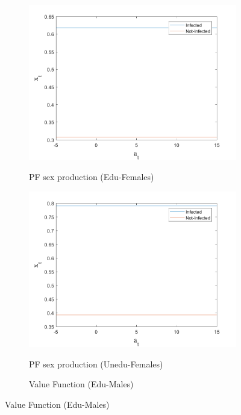 \begin{figure}[H]
\bigskip
\begin{subfigure}{0.5\textwidth}\caption{PF sex production (Edu-Females)}
   \includegraphics[width=\linewidth,height = 0.22\textheight]{figures/mio/FIG11.png}
    \label{fig_dert}
\end{subfigure}
\hspace*{\fill}
\begin{subfigure}{0.5\textwidth}\caption{PF sex production (Unedu-Females)}
   \includegraphics[width=\linewidth,height = 0.22\textheight]{figures/mio/FIG12.png}
    \label{fig:x_b}
\end{subfigure}
\bigskip
\begin{subfigure}{0.5\textwidth}\caption{Value Function (Edu-Males)}

\end{subfigure}
\end{figure}
